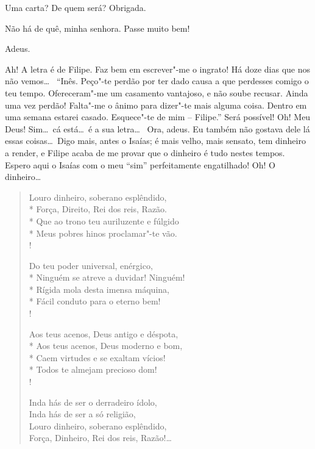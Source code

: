   Uma carta?  De quem será?
 Obrigada.

  Não há de quê, minha senhora. Passe muito bem!

 Adeus. 


\stagedir{\textsc{[Inês]}}

  Ah! A letra é de Filipe. Faz bem em escrever"-me o ingrato! Há doze
dias que nos não vemos\ldots\ 
“Inês.  Peço"-te perdão por ter dado causa a que perdesses comigo o teu tempo.
Ofereceram"-me um casamento vantajoso, e não soube recusar. Ainda uma vez perdão!
Falta"-me o ânimo para dizer"-te mais alguma coisa.
Dentro em uma semana estarei casado. Esquece"-te de mim -- Filipe.”
 Será possível! Oh! Meu Deus!  Sim\ldots\ cá
está\ldots\ é a sua letra\ldots\  Ora, adeus. Eu também não gostava dele lá essas coisas\ldots\ Digo
mais, antes o
Isaías; é mais velho, mais sensato, tem dinheiro a render, e Filipe acaba de me
provar que o dinheiro é tudo nestes tempos. Espero aqui o Isaías com o meu “sim”
perfeitamente engatilhado! Oh! O dinheiro\ldots

\begin{verse} 
Louro dinheiro, soberano esplêndido,\\*
Força, Direito, Rei dos reis, Razão.\\*
Que ao trono teu auriluzente e fúlgido\\*
Meus pobres hinos proclamar"-te vão.\\! 

Do teu poder universal, enérgico,\\*
Ninguém se atreve a duvidar! Ninguém!\\*
Rígida mola desta imensa máquina,\\*
Fácil conduto para o eterno bem!\\!

Aos teus acenos, Deus antigo e déspota,\\*
Aos teus acenos, Deus moderno e bom,\\*
Caem virtudes e se exaltam vícios!\\*
Todos te almejam precioso dom!\\!

Inda hás de ser o derradeiro ídolo,\\
Inda hás de ser a só religião,\\
Louro dinheiro, soberano esplêndido,\\
Força, Dinheiro, Rei dos reis, Razão!\ldots
\end{verse}


